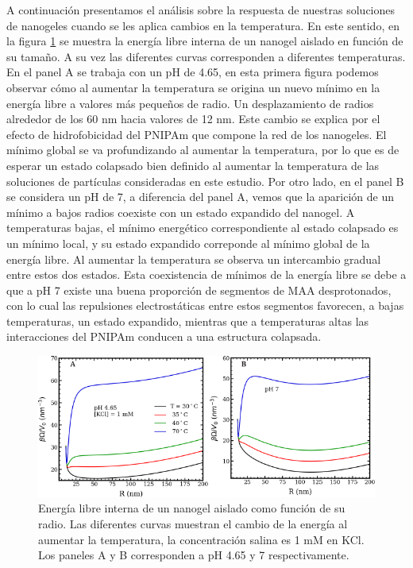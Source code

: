 A continuaci\'on presentamos el an\'alisis sobre la respuesta de nuestras soluciones de nanogeles cuando se les aplica  cambios en la temperatura. En este sentido, en la figura \ref{fig:mc:dfs_energy} se muestra la energ\'ia libre interna de un nanogel aislado en funci\'on de su tama\~no. A su vez las diferentes curvas corresponden a diferentes temperaturas. En el panel A se trabaja con un pH  de 4.65,  en esta primera figura podemos observar c\'omo al aumentar la temperatura se origina un nuevo m\'inimo en la energ\'ia libre a valores m\'as peque\~nos de radio. Un desplazamiento de radios alrededor de los 60 nm hacia valores de 12 nm. Este cambio se explica por el efecto de hidrofobicidad del PNIPAm que compone la red de los nanogeles. El m\'inimo global se va profundizando al aumentar la temperatura, por lo que es de esperar un estado colapsado bien definido al aumentar la temperatura de las soluciones de part\'iculas consideradas en este estudio. 
Por otro lado, en el panel B se considera un pH de 7, a diferencia del panel A, vemos que la aparici\'on de un m\'inimo a bajos radios coexiste con un estado expandido del nanogel. A temperaturas bajas, el m\'inimo energ\'etico correspondiente al estado colapsado es un m\'inimo local, y su estado expandido correponde al m\'inimo global de la energ\'ia libre. Al aumentar la temperatura se observa un intercambio gradual entre estos dos estados. Esta coexistencia de m\'inimos de la energ\'ia libre se debe a que a pH 7 existe una buena proporci\'on de segmentos de MAA desprotonados, con lo cual las repulsiones electrost\'aticas entre estos segmentos favorecen, a bajas temperaturas, un estado expandido, mientras que a temperaturas altas las interacciones del PNIPAm conducen a una estructura colapsada.%

	
	
	\begin{figure}[!htb]
		\centering
		\includegraphics[width=0.99\linewidth]{Figures/graph-mc/dfs_energy.pdf}
		\caption{Energ\'ia libre interna de un nanogel aislado como funci\'on de su radio. Las diferentes curvas muestran el cambio de la energ\'ia al aumentar la temperatura, la concentraci\'on salina es 1 mM en KCl. Los paneles A y B corresponden a pH 4.65 y 7 respectivamente.}
		\label{fig:mc:dfs_energy}
	\end{figure}

